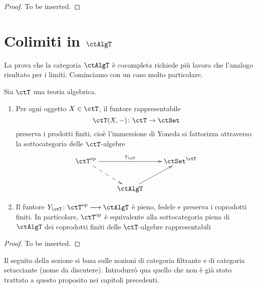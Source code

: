 \begin{proof}
To be inserted.
\end{proof}

\section{Colimiti in $\ctAlgT$}\label{sec_colim_AlgT}

La prova che la categoria $\ctAlgT$ è cocompleta richiede più lavoro che l'analogo risultato per i limiti. Cominciamo con un caso 
molto particolare.

\begin{proposition}\label{prop_Yoneda_alg}
Sia $\ctT$ una teoria algebrica.
\begin{enumerate}
\item Per ogni oggetto $X \in \ctT$, il funtore rappresentabile
\[
  \ctT(X,-) \colon \ctT \to \ctSet 
\]
preserva i prodotti finiti, cioè l'immersione di Yoneda si fattorizza attraverso la sottocategoria delle $\ctT$-algebre
$$\xymatrix{\ctT^{\mathrm{op}} \ar[rr]^-{Y_{\ctT}} \ar@{-->}[rd] & & \ctSet^{\ctT} \\
& \ctAlgT \ar[ru] }$$
\item Il funtore $Y_{\ctT} \colon \ctT^{\mathrm{op}} \fun \ctAlgT$ è pieno, fedele e preserva i coprodotti finiti. In particolare,
$\ctT^{\mathrm{op}}$ è equivalente alla sottocategoria piena di $\ctAlgT$ dei coprodotti finiti delle $\ctT$-algebre rappresentabili
\end{enumerate}
\end{proposition}

\begin{proof}
To be inserted.
\end{proof}

\begin{warning}\label{caveat_filtr_sift}
Il seguito della sezione si basa sulle nozioni di categoria filtrante e di categoria setacciante (nome da discutere). Introdurrò qua
quello che non è già stato trattato a questo proposito nei capitoli precedenti.
\end{warning} 

